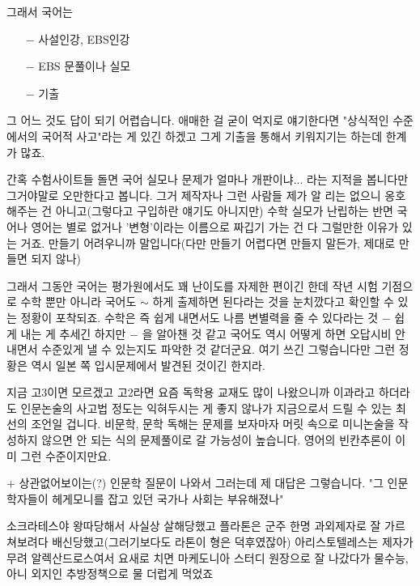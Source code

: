 그래서 국어는
\begin{itemize}
    \item[$-$] 사설인강, EBS인강
    \item[$-$] EBS 문풀이나 실모
    \item[$-$] 기출
\end{itemize}

\vspace{5mm}

그 어느 것도 답이 되기 어렵습니다.
애매한 걸 굳이 억지로 얘기한다면 "상식적인 수준에서의 국어적 사고"라는 게 있긴 하겠고
그게 기출을 통해서 키워지기는 하는데 한계가 많죠.
\vspace{5mm}

간혹 수험사이트들 돌면 국어 실모나 문제가 얼마나 개판이냐... 라는 지적을 봅니다만
그거야말로 오만한다고 봅니다. 그거 제작자나 그런 사람들 제가 알 리는 없으니 옹호해주는 건 아니고(그렇다고 구입하란 얘기도 아니지만)
수학 실모가 난립하는 반면 국어나 영어는 별로 없거나 '변형'이라는 이름으로 짜깁기 가는 건 다 그럴만한 이유가 있는 거죠.
만들기 어려우니까 말입니다(다만 만들기 어렵다면 만들지 말든가, 제대로 만들면 되지 않나)
\vspace{5mm}

그래서 그동안 국어는 평가원에서도 꽤 난이도를 자제한 편이긴 한데
작년 시험 기점으로 수학 뿐만 아니라 국어도 $\sim$ 하게 출제하면 된다라는 것을 눈치깠다고 확인할 수 있는 정황이 포착되죠.
수학은 즉 쉽게 내면서도 나름 변별력을 줄 수 있다라는 것 $-$ 쉽게 내는 게 추세긴 하지만 $-$ 을 알아챈 것 같고
국어도 역시 어떻게 하면 오답시비 안 내면서 수준있게 낼 수 있는지도 파악한 것 같더군요.
여기 쓰긴 그렇습니다만 그런 정황은 역시 일본 쪽 입시문제에서 발견된 것이긴 한지라.
\vspace{5mm}

지금 고3이면 모르겠고 고2라면
요즘 독학용 교재도 많이 나왔으니까 이과라고 하더라도 인문논술의 사고법 정도는 익혀두시는 게 좋지 않나가
지금으로서 드릴 수 있는 최선의 조언일 겁니다.
비문학, 문학 독해는 문제를 보자마자 머릿 속으로 미니논술을 작성하지 않으면 안 되는 식의 문제풀이로 갈 가능성이 높습니다.
영어의 빈칸추론이 이미 그런 수준이지만요.
\vspace{5mm}

+ 상관없어보이는(?) 인문학 질문이 나와서 그러는데 제 대답은 그렇습니다.
"그 인문학자들이 헤게모니를 잡고 있던 국가나 사회는 부유해졌나"
\vspace{5mm}

소크라테스야 왕따당해서 사실상 살해당했고
플라톤은 군주 한명 과외제자로 잘 가르쳐보려다 배신당했고(그러기보다도 라톤이 형은 덕후였잖아)
아리스토텔레스는 제자가 무려 알렉산드로스여서 요새로 치면 마케도니아 스터디 원장으로 잘 나갔다가
물수능, 아니 외지인 추방정책으로 물 더럽게 먹었죠
\vspace{5mm}

